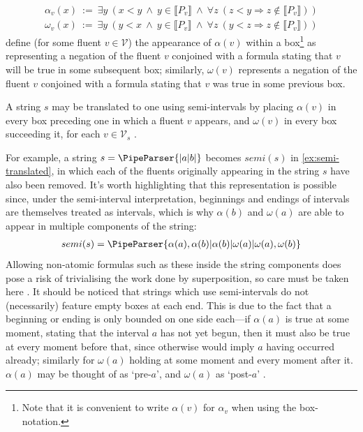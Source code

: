 \documentclass[a4paper,12pt,leqno,twoside]{article}
\newcommand{\vph}[1]{\vphantom{#1}}
\newcommand{\ebox}[1]{\fbox{$\vph{'(),}#1$}}
\newcommand{\V}{\mathcal{V}}
\newcommand{\EventString}[1]{%
	\renewcommand*{\do}[1]{\ebox{##1}}%
	\PipeParser{#1}%
}
\begin{document}
\begin{align}
	\alpha_v(x) ~:=~ \exists y ~(x < y ~\land~ y \in \llbracket P_v \rrbracket ~\land~ \forall z ~(z < y \Longrightarrow z \notin \llbracket P_v \rrbracket))\label{def:alpha}\\
	\omega_v(x) ~:=~ \exists y ~(y < x ~\land~ y \in \llbracket P_v \rrbracket ~\land~ \forall z ~(y < z \Longrightarrow z \notin \llbracket P_v \rrbracket))\label{def:omega}
\end{align}
 define (for some fluent $v \in \V$) the appearance of $\alpha(v)$ within a box\footnote{Note that it is convenient to write $\alpha(v)$ for $\alpha_v$ when using the box-notation.} as representing a negation of the fluent $v$ conjoined with a formula stating that $v$ will be true in some subsequent box; similarly, $\omega(v)$ represents a negation of the fluent $v$ conjoined with a formula stating that $v$ was true in some previous box. 

A string $s$ may be translated to one using semi-intervals by placing $\alpha(v)$ in every box preceding one in which a fluent $v$ appears, and $\omega(v)$ in every box succeeding it, for each $v \in \V_s$ \citep{woods2018improving}.

For example, a string $s = \EventString{{}|a|b|{}}$ becomes $semi(s)$ in \cref{ex:semi-translated}, in which each of the fluents originally appearing in the string $s$ have also been removed. It's worth highlighting that this representation is possible since, under the semi-interval interpretation, beginnings and endings of intervals are themselves treated as intervals, which is why $\alpha(b)$ and $\omega(a)$ are able to appear in multiple components of the string:
\begin{align}
	semi(s) = \EventString{\alpha(a),\alpha(b)|\alpha(b)|\omega(a)|\omega(a),\omega(b)}\label{ex:semi-translated}
\end{align}
Allowing non-atomic formulas such as these inside the string components does pose a risk of trivialising the work done by superposition, so care must be taken here \citep{woods2018improving}. It should be noticed that strings which use semi-intervals do not (necessarily) feature empty boxes at each end. This is due to the fact that a beginning or ending is only bounded on one side each---if $\alpha(a)$ is true at some moment, stating that the interval $a$ has not yet begun, then it must also be true at every moment before that, since otherwise would imply $a$ having occurred already; similarly for $\omega(a)$ holding at some moment and every moment after it. $\alpha(a)$ may be thought of as `pre-$a$', and $\omega(a)$ as `post-$a$' \citep{woods2018improving}.
\end{document}
